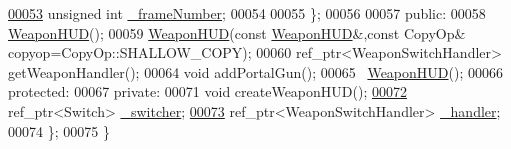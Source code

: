 \begin{DoxyCode}
\hypertarget{_weapon_h_u_d_8h_source_l00053}{}\hyperlink{classbrtr_1_1_weapon_h_u_d_1_1_weapon_switch_handler_abfa6e6c2904d1e6ed7cd5d029a632ddf}{00053}         \textcolor{keywordtype}{unsigned} \textcolor{keywordtype}{int} \hyperlink{classbrtr_1_1_weapon_h_u_d_1_1_weapon_switch_handler_abfa6e6c2904d1e6ed7cd5d029a632ddf}{\_frameNumber};
00054 
00055     \};
00056 
00057 \textcolor{keyword}{public}:
00058     \hyperlink{classbrtr_1_1_weapon_h_u_d}{WeaponHUD}();
00059     \hyperlink{classbrtr_1_1_weapon_h_u_d}{WeaponHUD}(\textcolor{keyword}{const} \hyperlink{classbrtr_1_1_weapon_h_u_d}{WeaponHUD}&,\textcolor{keyword}{const} CopyOp& copyop=CopyOp::SHALLOW\_COPY);
00060     ref\_ptr<WeaponSwitchHandler> getWeaponHandler();
00064     \textcolor{keywordtype}{void} addPortalGun();
00065     ~\hyperlink{classbrtr_1_1_weapon_h_u_d}{WeaponHUD}();
00066 \textcolor{keyword}{protected}:
00067 \textcolor{keyword}{private}:
00071     \textcolor{keywordtype}{void} createWeaponHUD();
\hypertarget{_weapon_h_u_d_8h_source_l00072}{}\hyperlink{classbrtr_1_1_weapon_h_u_d_a32d5e498c15faa87f3bcfa83ca6c5b0e}{00072}     ref\_ptr<Switch> \hyperlink{classbrtr_1_1_weapon_h_u_d_a32d5e498c15faa87f3bcfa83ca6c5b0e}{\_switcher};
\hypertarget{_weapon_h_u_d_8h_source_l00073}{}\hyperlink{classbrtr_1_1_weapon_h_u_d_a4ebf9d9e600e3a6b9f5d8601c084ee51}{00073}     ref\_ptr<WeaponSwitchHandler> \hyperlink{classbrtr_1_1_weapon_h_u_d_a4ebf9d9e600e3a6b9f5d8601c084ee51}{\_handler};
00074 \};
00075 \}
\end{DoxyCode}
